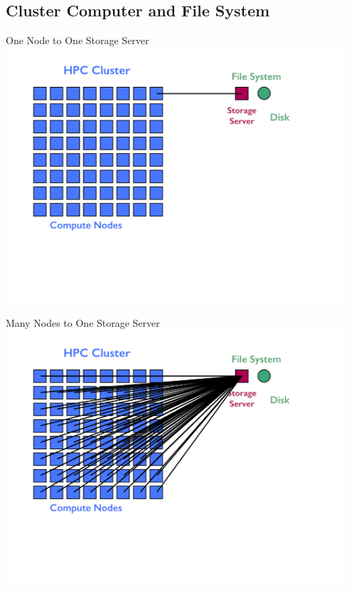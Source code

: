 \subsection{Cluster Computer and File System}
\makesubcontentsslidessec

\begin{frame}
  \begin{block}{One Node to One Storage Server}
    \includegraphics[width=0.95\textwidth]{../common/pics/hardware/ParallelHardware15.pdf}
  \end{block}
\end{frame}

\begin{frame}
  \begin{block}{Many Nodes to One Storage Server}
    \includegraphics[width=0.95\textwidth]{../common/pics/hardware/ParallelHardware16.pdf}
  \end{block}
\end{frame}

